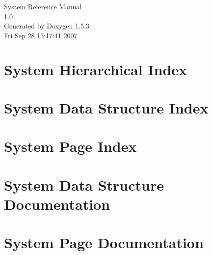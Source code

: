 \documentclass[a4paper]{book}
\begin{document}
\begin{titlepage}
\vspace*{7cm}
\begin{center}
{\Large System Reference Manual\\[1ex]\large 1.0 }\\
\vspace*{1cm}
{\large Generated by Doxygen 1.5.3}\\
\vspace*{0.5cm}
{\small Fri Sep 28 13:17:41 2007}\\
\end{center}
\end{titlepage}
\clearemptydoublepage
{}
\tableofcontents
\clearemptydoublepage
{}
\chapter{System Hierarchical Index}

\chapter{System Data Structure Index}

\chapter{System Page Index}

\chapter{System Data Structure Documentation}







\chapter{System Page Documentation}

\printindex
\end{document}

